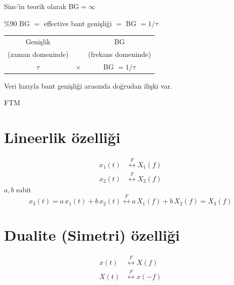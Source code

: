 \documentclass[11pt,a4paper]{article}
\begin{document}
Sinc'in teorik olarak BG$=\infty$

\textcolor{kirmizikalem}{\%90 BG $=$ effective bant genişliği $=$ BG $=1/\tau$}

\noindent
\begin{minipage}[c]{0.4\linewidth}
\end{minipage}
\hfill
\begin{minipage}[c]{0.55\linewidth}
\centering
\begin{tabular}{ccc}
Genişlik & & BG \\
{\footnotesize (zaman domeninde)} & & {\footnotesize (frekans domeninde)} \\
$\tau$ & $\times$ & BG $=1/\tau$
\end{tabular}
\end{minipage}

Veri hızıyla bant genişliği arasında doğrudan ilişki var.

{\small FTM}

\section{Lineerlik özelliği}
\begin{align*}
x_1(t)&\overset{F}{\longleftrightarrow}X_1(f)\\
x_2(t)&\overset{F}{\longleftrightarrow}X_2(f)
\end{align*}
$a,b$ sabit
\[
x_3(t)=a\,x_1(t)+b\,x_2(t)\overset{F}{\longleftrightarrow}a\,X_1(f)+b\,X_2(f)=X_3(f)
\]

\section{Dualite (Simetri) özelliği}
\begin{align*}
x(t)&\overset{F}{\longleftrightarrow}X(f)\\
X(t)&\overset{F}{\longleftrightarrow}x(-f)
\end{align*}
\end{document}
